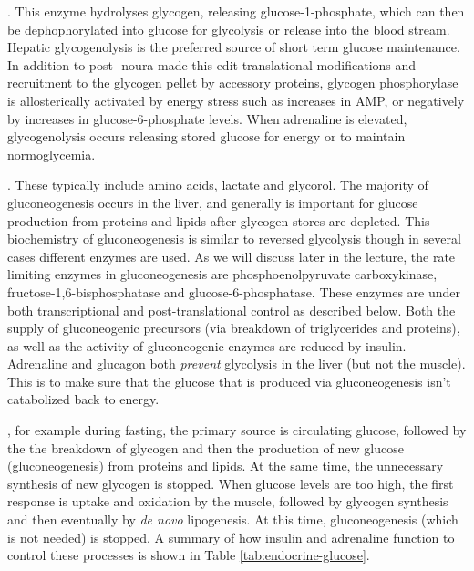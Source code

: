 \documentclass{tufte-handout}
\begin{document}
.  This enzyme hydrolyses glycogen, releasing glucose-1-phosphate, which can then be dephophorylated into glucose for glycolysis or release into the blood stream.  Hepatic glycogenolysis is the preferred source of short term glucose maintenance.  In addition to post- noura made this edit translational modifications and recruitment to the glycogen pellet by accessory proteins, glycogen phosphorylase is allosterically activated by energy stress such as increases in AMP, or negatively by increases in glucose-6-phosphate levels.  When adrenaline is elevated, glycogenolysis occurs releasing stored glucose for energy or to maintain normoglycemia.

.  These typically include amino acids, lactate and glycorol.  The majority of gluconeogenesis occurs in the liver, and generally is important for glucose production from proteins and lipids after glycogen stores are depleted.  This biochemistry of gluconeogenesis is similar to reversed glycolysis though in several cases different enzymes are used.  As we will discuss later in the lecture, the rate limiting enzymes in gluconeogenesis are phosphoenolpyruvate carboxykinase, fructose-1,6-bisphosphatase and glucose-6-phosphatase.  These enzymes are under both transcriptional and post-translational control as described below.  Both the supply of gluconeogenic precursors (via breakdown of triglycerides and proteins), as well as the activity of gluconeogenic enzymes are reduced by insulin.  Adrenaline and glucagon both \emph{prevent} glycolysis in the liver (but not the muscle).  This is to make sure that the glucose that is produced via gluconeogenesis isn't catabolized back to energy.

, for example during fasting, the primary source is circulating glucose, followed by the the breakdown of glycogen and then the production of new glucose (gluconeogenesis) from proteins and lipids.  At the same time, the unnecessary synthesis of new glycogen is stopped.  When glucose levels are too high, the first response is uptake and oxidation by the muscle, followed by glycogen synthesis and then eventually by \textit{de novo} lipogenesis.  At this time, gluconeogenesis (which is not needed) is stopped.  A summary of how insulin and adrenaline function to control these processes is shown in Table \ref{tab:endocrine-glucose}.
\end{document}
